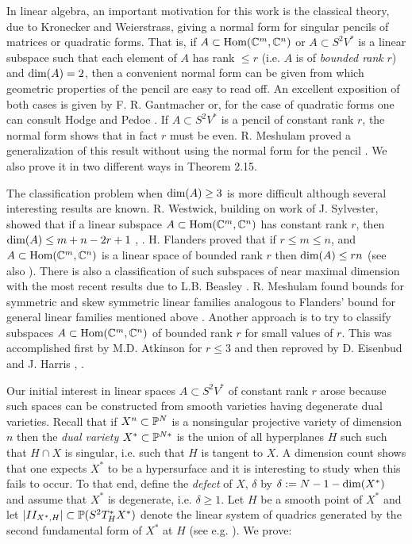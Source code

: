 In linear algebra, an important motivation for this work is the
classical theory, due to Kronecker and Weierstrass, giving a 
normal form for singular pencils of matrices or quadratic forms.
That is, if $A \subset \text{Hom}( \Bbb C^{m}, \Bbb C^{n})$ or $A \subset 
S^2V^*$ is a linear subspace such that each element of $A$ has rank
$\le r$ (i.e. $A$ is of {\it bounded rank} $r$) and $\text{dim}(A) = 2$,
then a convenient normal form can be given 
from which geometric properties of the pencil are easy to read off.
An excellent exposition of both cases is given by F. R. Gantmacher 
\cite{G, Chp. XII} or, for the case of quadratic forms one can
consult Hodge and Pedoe \cite{HP, Chp. VIII, Sec. 10}.
If $A \subset S^2 V^*$
is  a pencil of constant rank $r$, the normal form shows
that in fact $r$ must be even. R. Meshulam proved a generalization of
this result without using the normal form for the pencil \cite{M}. We
also prove it in two different ways in Theorem 2.15.

The classification problem when $\text{dim}(A) \ge 3$ is more difficult although
several interesting results are known.
R. Westwick, building on work of J. Sylvester, showed that if a linear 
subspace $A \subset \text{Hom}( \Bbb C^{m}, \Bbb C^{n})$ has constant rank $r$, then
$\text{dim}(A) \le m + n - 2r + 1$ \cite{W}, \cite{S}. 
H. Flanders proved  that if $r \le m \le n$, and
$A \subset \text{Hom}( \Bbb C^{m}, \Bbb C^{n})$ is a linear space of bounded
rank $r$ then $\text{dim}(A) \le rn$ \cite{F} (see also \cite{M2}). There is
also a classification of such subspaces  of near maximal
dimension with the most recent results due to L.B. Beasley \cite{B}.
R. Meshulam found  bounds for symmetric and skew symmetric linear families
analogous to Flanders' bound for general linear families mentioned
above \cite{M3}.
Another approach
is to try to classify subspaces $A \subset \text{Hom}( \Bbb C^{m}, \Bbb C^{n})$
of bounded rank $r$ for small values of $r$. This was accomplished
first by M.D. Atkinson for $r \le 3$ and then reproved  
by D. Eisenbud and J. Harris \cite{A}, \cite{EH}.

Our initial interest in linear spaces $A \subset S^2 V^*$ of constant 
rank $r$ arose because such spaces can be constructed from
smooth varieties having degenerate dual varieties. Recall that if
$X^n \subset \Bbb P^{N}$ is a nonsingular projective variety of dimension $n$
then the {\it dual variety} $X^* \subset \Bbb P^{N*}$ is the union of all 
hyperplanes $H$ such such that $H \cap X$ is singular, i.e. such that $H$
is tangent to $X$. A dimension count shows that
one expects $X^*$ to be a hypersurface and it is interesting to study when
this fails to occur. To that end,  define the {\it defect} of $X$, 
$\delta$ by $\delta := N-1 - \text{dim}(X^*)$ and  assume that $X^*$ is
degenerate, i.e. $\delta \ge 1$. Let $H$ be a smooth point of $X^*$
and let $|II_{X^*, H}|  \subset \Bbb P (S^2T^*_H X^*)$ 
denote the linear system of quadrics generated by the second fundamental
form of $X^*$ at $H$ (see e.g. \cite{Lan}). We prove:

